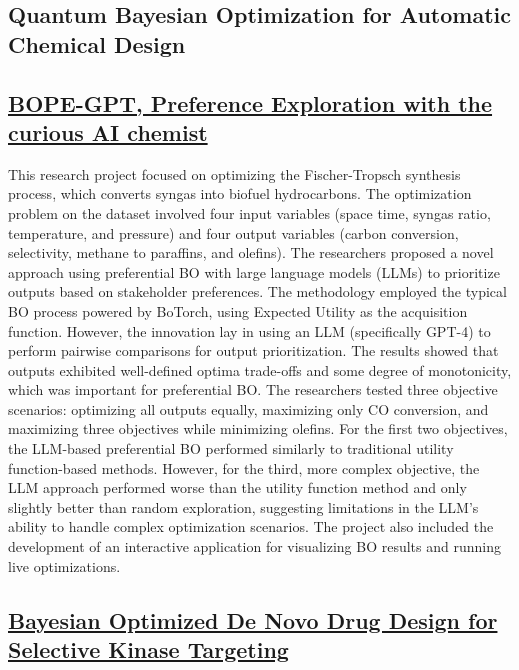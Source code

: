  \subsection*{Quantum Bayesian Optimization for Automatic Chemical Design}


 \subsection*{\href{https://www.youtube.com/watch?v=AbRDOdmafB8}{BOPE-GPT, Preference Exploration with the curious AI chemist}}

This research project focused on optimizing the Fischer-Tropsch synthesis process\cite{mahmoudi2017review}, which converts syngas into biofuel hydrocarbons. The optimization problem on the dataset\cite{lozano2008single,chakkingal2022multi} involved four input variables (space time, syngas ratio, temperature, and pressure) and four output variables (carbon conversion, selectivity, methane to paraffins, and olefins). The researchers proposed a novel approach using preferential BO\cite{lin2022preference} with large language models (LLMs) to prioritize outputs based on stakeholder preferences. The methodology employed the typical BO process powered by BoTorch, using Expected Utility as the acquisition function. However, the innovation lay in using an LLM (specifically GPT-4) to perform pairwise comparisons for output prioritization. The results showed that outputs exhibited well-defined optima trade-offs and some degree of monotonicity, which was important for preferential BO. The researchers tested three objective scenarios: optimizing all outputs equally, maximizing only CO conversion, and maximizing three objectives while minimizing olefins. For the first two objectives, the LLM-based preferential BO performed similarly to traditional utility function-based methods. However, for the third, more complex objective, the LLM approach performed worse than the utility function method and only slightly better than random exploration, suggesting limitations in the LLM's ability to handle complex optimization scenarios. The project also included the development of an interactive application for visualizing BO results and running live optimizations.
 \subsection*{\href{https://www.youtube.com/watch?v=nVtTYXxG7i4}{Bayesian Optimized De Novo Drug Design for Selective Kinase Targeting }}

